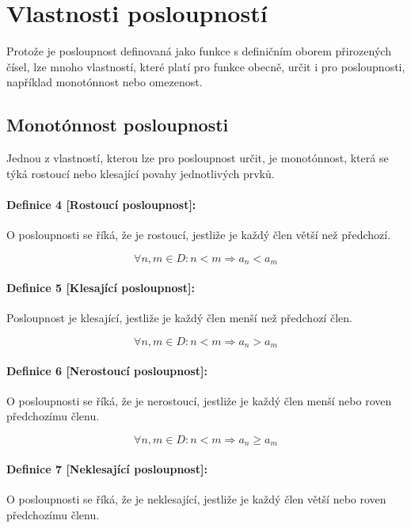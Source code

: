 \documentclass[12pt]{report}			%
\begin{document}
\section{Vlastnosti posloupností}
Protože je posloupnost definovaná jako funkce s definičním oborem přirozených čísel,  lze mnoho vlastností, které platí pro funkce obecně, určit i pro posloupnosti, například monotónnost nebo omezenost.
\subsection{Monotónnost posloupnosti}
Jednou z vlastností, kterou lze pro posloupnost určit, je monotónnost, která se týká rostoucí nebo klesající povahy jednotlivých prvků.
\paragraph{Definice 4 [Rostoucí posloupnost]:}
O posloupnosti se říká, že je rostoucí, jestliže je každý člen větší než předchozí.

\begin{equation}
\forall n,m \in D:n<m \Rightarrow a_n < a_m
\end{equation}

\paragraph{Definice 5 [Klesající posloupnost]:}
Posloupnost je klesající, jestliže je každý člen menší než předchozí člen.

\begin{equation}
\forall n,m \in D:n<m \Rightarrow a_n > a_m
\end{equation}

\paragraph{Definice 6 [Nerostoucí posloupnost]:}
O posloupnosti se říká, že je nerostoucí, jestliže je každý člen menší nebo roven předchozímu členu.

\begin{equation}
\forall n,m \in D:n<m \Rightarrow a_n \geq a_m
\end{equation}

\paragraph{Definice 7 [Neklesající posloupnost]:}
O posloupnosti se říká, že je neklesající, jestliže je každý člen větší nebo roven předchozímu členu.
\end{document}
